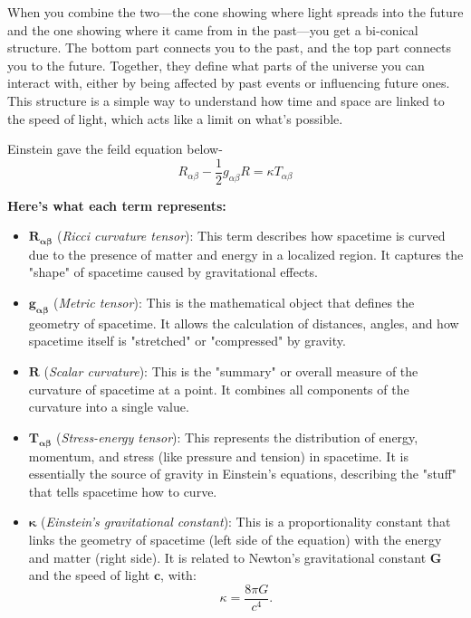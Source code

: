 \documentclass[12pt,a4paper]{article}
\begin{document}
When you combine the two—the cone showing where light spreads into the future and the one showing where it came from in the past—you get a bi-conical structure. The bottom part connects you to the past, and the top part connects you to the future. Together, they define what parts of the universe you can interact with, either by being affected by past events or influencing future ones. This structure is a simple way to understand how time and space are linked to the speed of light, which acts like a limit on what’s possible.

Einstein  gave the feild equation below- 
\[
R_{\alpha\beta} - \frac{1}{2} g_{\alpha\beta} R = \kappa T_{\alpha\beta}
\]

\textbf{Here’s what each term represents:}

\begin{itemize}
    \item \(\mathbf{R_{\alpha\beta}} \) (\textit{Ricci curvature tensor}):
    This term describes how spacetime is curved due to the presence of matter and energy in a localized region. It captures the "shape" of spacetime caused by gravitational effects.
    
    \item \(\mathbf{g_{\alpha\beta}} \) (\textit{Metric tensor}):
    This is the mathematical object that defines the geometry of spacetime. It allows the calculation of distances, angles, and how spacetime itself is "stretched" or "compressed" by gravity.
    
    \item \(\mathbf{R} \) (\textit{Scalar curvature}):
    This is the "summary" or overall measure of the curvature of spacetime at a point. It combines all components of the curvature into a single value.
    
    \item \(\mathbf{T_{\alpha\beta}} \) (\textit{Stress-energy tensor}):
    This represents the distribution of energy, momentum, and stress (like pressure and tension) in spacetime. It is essentially the source of gravity in Einstein's equations, describing the "stuff" that tells spacetime how to curve.
    
    \item \(\mathbf{\kappa} \) (\textit{Einstein's gravitational constant}):
    This is a proportionality constant that links the geometry of spacetime (left side of the equation) with the energy and matter (right side). It is related to Newton's gravitational constant \(\mathbf{G}\) and the speed of light \(\mathbf{c}\), with:
    \[
    \kappa = \frac{8 \pi G}{c^4}.
    \]
\end{itemize}
\end{document}
